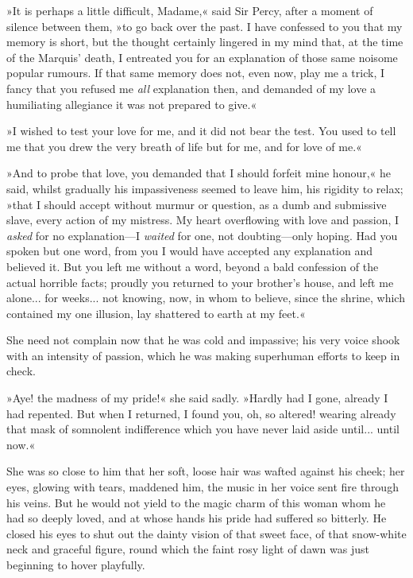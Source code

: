 »It is perhaps a little difficult, Madame,« said Sir Percy, after a moment of silence between them, »to go back over the past. I have confessed to you that my memory is short, but the thought certainly lingered in my mind that, at the time of the Marquis' death, I entreated you for an explanation of those same noisome popular rumours. If that same memory does not, even now, play me a trick, I fancy that you refused me \textit{all} explanation then, and demanded of my love a humiliating allegiance it was not prepared to give.«

»I wished to test your love for me, and it did not bear the test. You used to tell me that you drew the very breath of life but for me, and for love of me.«

»And to probe that love, you demanded that I should forfeit mine honour,« he said, whilst gradually his impassiveness seemed to leave him, his rigidity to relax; »that I should accept without murmur or question, as a dumb and submissive slave, every action of my mistress. My heart overflowing with love and passion, I \textit{asked} for no explanation\allowbreak---\allowbreak I \textit{waited} for one, not doubting\allowbreak---\allowbreak only hoping. Had you spoken but one word, from you I would have accepted any explanation and believed it. But you left me without a word, beyond a bald confession of the actual horrible facts; proudly you returned to your brother's house, and left me alone... for weeks... not knowing, now, in whom to believe, since the shrine, which contained my one illusion, lay shattered to earth at my feet.«

She need not complain now that he was cold and impassive; his very voice shook with an intensity of passion, which he was making superhuman efforts to keep in check.

»Aye! the madness of my pride!« she said sadly. »Hardly had I gone, already I had repented. But when I returned, I found you, oh, so altered! wearing already that mask of somnolent indifference which you have never laid aside until... until now.«

She was so close to him that her soft, loose hair was wafted against his cheek; her eyes, glowing with tears, maddened him, the music in her voice sent fire through his veins. But he would not yield to the magic charm of this woman whom he had so deeply loved, and at whose hands his pride had suffered so bitterly. He closed his eyes to shut out the dainty vision of that sweet face, of that snow-white neck and graceful figure, round which the faint rosy light of dawn was just beginning to hover playfully.

